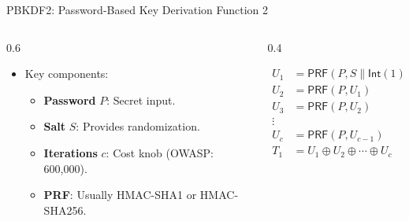 \ifdefined\PRESENTATION\else\PassOptionsToClass{handout}{beamer}\fi\documentclass[aspectratio=169, lualatex]{beamer}
\begin{document}
\begin{frame}{PBKDF2: Password-Based Key Derivation Function 2}
	\begin{columns}[c]
		\begin{column}{0.6\textwidth}
			\begin{itemize}
				\item Key components:
				      \begin{itemize}
					      \item \textbf{Password} $P$: Secret input.
					      \item \textbf{Salt} $S$: Provides randomization.
					      \item \textbf{Iterations} $c$: Cost knob (OWASP: 600,000).
					      \item \textbf{PRF}: Usually HMAC-SHA1 or HMAC-SHA256.
				      \end{itemize}
			\end{itemize}
		\end{column}
		\begin{column}{0.4\textwidth}
			\begin{tcolorbox}[colback=black!5!white,colframe=ciphergray]
				\small
				\begin{align*}
					U_1 & = \mathsf{PRF}(P, S \| \mathsf{Int}(1))    \\
					U_2 & = \mathsf{PRF}(P, U_1)                     \\
					U_3 & = \mathsf{PRF}(P, U_2)                     \\
					\vdots                                           \\
					U_c & = \mathsf{PRF}(P, U_{c-1})                 \\
					T_1 & = U_1 \oplus U_2 \oplus \cdots \oplus U_c
				\end{align*}
			\end{tcolorbox}
		\end{column}
	\end{columns}
\end{frame}
\end{document}
